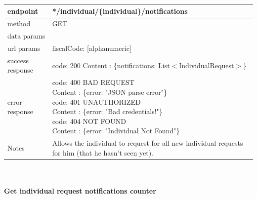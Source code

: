 \begin{legal}
\begin{legal}
\begin{itemize}
								\begin{tabularx}{\linewidth}{| l| l }
									\hline
									endpoint & */individual/\{individual\}/notifications \\
									\hline
									method & GET \\
									\hline
									data params & \\
									\hline
									url params &
									\parbox{0.7\textwidth}{
										\bigskip
										fiscalCode: [alphanumeric]
										\bigskip
									} \\
									\hline
									success response &
									\parbox{0.7\textwidth}{
										\bigskip
										code: 200\\
										Content : \{notifications: List$<$IndividualRequest$>$\}
										\bigskip
									} \\
									\hline
									error response &
									\parbox{0.7\textwidth}{
										\bigskip
										code: 400 BAD REQUEST \\
										Content : \{error: "JSON parse error"\}\\
										code: 401 UNAUTHORIZED \\
										Content : \{error: "Bad credentials!"\}\\
										code: 404 NOT FOUND \\
										Content : \{error: "Individual Not Found"\}
										\bigskip
									} \\
									\hline
									Notes & 
									\parbox{0.7\textwidth}{
										\bigskip Allows the individual to request for all new individual requests for him (that he hasn't seen yet).
									\bigskip}  \\
									\hline
								\end{tabularx}\\\\
								
								\textbf{Get individual request notifications counter} \\
			

\end{itemize}
\end{legal}
\end{legal}
